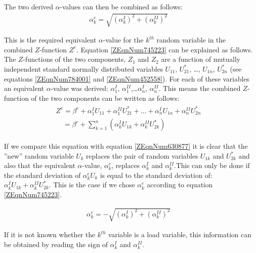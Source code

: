 {The two derived $\alpha$-values can then be combined as follows:
\begin{align}
\alpha _{k}^{e} =\sqrt{\left(\alpha _{k}^{I} \right)^{2} +\left(\alpha _{k}^{II} \right)^{2} } \label{ZEqnNum745223} 
\end{align}

This is the required equivalent $\alpha$-value for the $k^{th}$ random variable in the combined $Z$-function $Z^e$. Equation \eqref{ZEqnNum745223} can be explained as follows. The $Z$-functions of the two components, $Z_1$ and $Z_2$ are a function of mutually independent standard normally distributed variables $U_{11}$, $U_{21}^{*}$, \dots  , $U_{1n}$, $U_{2n}^{*}$ (see equations \eqref{ZEqnNum784001} and \eqref{ZEqnNum452558}). For each of these variables an equivalent $\alpha$-value was derived: $\alpha_1^I$, $\alpha_1^{II}$,\dots  $\alpha_n^I$, $\alpha_n^{II}$. This means the combined $Z$-function of the two components can be written as follows: 
\begin{align}
\begin{array}{l} {Z^{e} =\beta ^{e} +\alpha _{1}^{I} U_{11} +\alpha _{1}^{II} U_{21}^{*} +...+\alpha _{n}^{I} U_{1n} +\alpha _{n}^{II} U_{2n}^{*} } \\ {\quad  =\beta ^{e} +\sum _{k=1}^{n}\left(\alpha _{k}^{I} U_{1k} +\alpha _{k}^{II} U_{2k}^{*} \right) } \end{array}
\end{align}

If we compare this equation with equation \eqref{ZEqnNum630877} it is clear that the ''new'' random variable $U_k$ replaces the pair of random variables $U_{1k}$ and $U_{2k}^{*}$ and also that the equivalent $\alpha$-value, $\alpha_k^e$, replaces $\alpha_k^{I}$ and $\alpha_k^{II}$.This can only be done if the standard deviation of $\alpha_k^e U_k$ is equal to the standard deviation of: $\alpha_k^{I} U_{1k}+\alpha_k^{II} U_{2k}^{*}$. This is the case if we chose $\alpha_k^e$ according to equation \eqref{ZEqnNum745223}.

\begin{align}
\alpha _{k}^{e} =-\sqrt{\left(\alpha _{k}^{I} \right)^{2} +\left(\alpha _{k}^{II} \right)^{2} }
\end{align}

If it is not known whether the $k^{th}$ variable is a load variable, this information can be obtained by reading the sign of $\alpha _{k}^{I}$ and $\alpha _{k}^{II}$.

}
